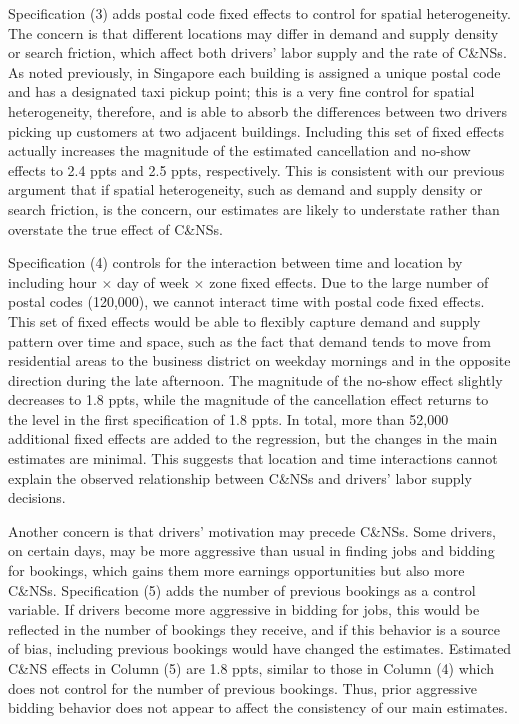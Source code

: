 \documentclass[reviewmode]{AEA}
\begin{document}
Specification (3) adds postal code fixed effects to control for spatial heterogeneity. The concern is that different locations may differ in demand and supply density or search friction, which affect both drivers' labor supply and the rate of C\&NSs. As noted previously, in Singapore each building is assigned a unique postal code and has a designated taxi pickup point; this is a very fine control for spatial heterogeneity, therefore, and is able to absorb the differences between two drivers picking up customers at two adjacent buildings. Including this set of fixed effects actually increases the magnitude of the estimated cancellation and no-show effects to 2.4 ppts and 2.5 ppts, respectively. This is consistent with our previous argument that if spatial heterogeneity, such as demand and supply density or search friction, is the concern, our estimates are likely to understate rather than overstate the true effect of C\&NSs.

Specification (4) controls for the interaction between time and location by including hour $\times$ day of week $\times$ zone fixed effects. Due to the large number of postal codes (120,000), we cannot interact time with postal code fixed effects. 
This set of fixed effects would be able to flexibly capture demand and supply pattern over time and space, such as the fact that demand tends to move from residential areas to the business district on weekday mornings and in the opposite direction during the late afternoon. The magnitude of the no-show effect slightly decreases to 1.8 ppts, while the magnitude of the cancellation effect returns to the level in the first specification of 1.8 ppts. In total, more than 52,000 additional fixed effects are added to the regression, but the changes in the main estimates are minimal. This suggests that location and time interactions cannot explain the observed relationship between C\&NSs and drivers' labor supply decisions.

Another concern is that drivers' motivation may precede C\&NSs. Some drivers, on certain days, may be more aggressive than usual in finding jobs and bidding for bookings, which gains them more earnings opportunities but also more C\&NSs. Specification (5) adds the number of previous bookings as a control variable. If drivers become more aggressive in bidding for jobs, this would be reflected in the number of bookings they receive, and if this behavior is a source of bias, including previous bookings would have changed the estimates. Estimated C\&NS effects in Column (5) are 1.8 ppts, similar to those in Column (4) which does not control for the number of previous bookings. Thus, prior aggressive bidding behavior does not appear to affect the consistency of our main estimates.
\end{document}
